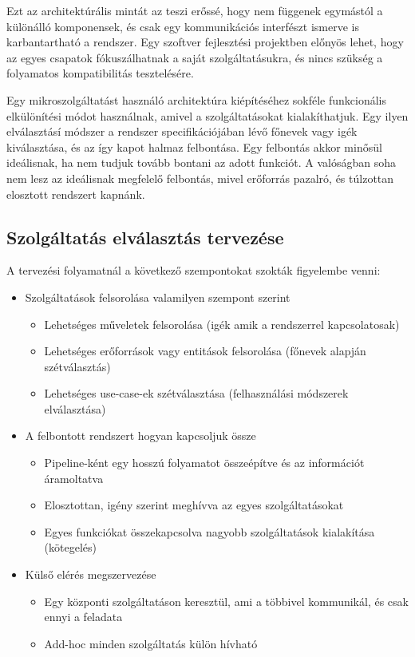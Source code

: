 \documentclass[11pt,magyar,a4paper,twoside,]{report}
\providecommand{\tightlist}{%
  \setlength{\itemsep}{0pt}\setlength{\parskip}{0pt}}
\begin{document}
Ezt az architektúrális mintát az teszi erőssé, hogy nem függenek
egymástól a különálló komponensek, és csak egy kommunikációs interfészt
ismerve is karbantartható a rendszer. Egy szoftver fejlesztési
projektben előnyös lehet, hogy az egyes csapatok fókuszálhatnak a saját
szolgáltatásukra, és nincs szükség a folyamatos kompatibilitás
tesztelésére.

Egy mikroszolgáltatást használó architektúra kiépítéséhez sokféle
funkcionális elkülönítési módot használnak, amivel a szolgáltatásokat
kialakíthatjuk. Egy ilyen elválasztásí módszer a rendszer
specifikációjában lévő főnevek vagy igék kiválasztása, és az így kapot
halmaz felbontása. Egy felbontás akkor minősül ideálisnak, ha nem tudjuk
tovább bontani az adott funkciót. A valóságban soha nem lesz az
ideálisnak megfelelő felbontás, mivel erőforrás pazalró, és túlzottan
elosztott rendszert kapnánk.

\subsection{\texorpdfstring{Szolgáltatás elválasztás
tervezése\label{splitting}}{Szolgáltatás elválasztás tervezése}}\label{szolguxe1ltatuxe1s-elvuxe1lasztuxe1s-tervezuxe9se}

A tervezési folyamatnál a következő szempontokat szokták figyelembe
venni:

\begin{itemize}
\tightlist
\item
  Szolgáltatások felsorolása valamilyen szempont szerint

  \begin{itemize}
  \tightlist
  \item
    Lehetséges műveletek felsorolása (igék amik a rendszerrel
    kapcsolatosak)
  \item
    Lehetséges erőforrások vagy entitások felsorolása (főnevek alapján
    szétválasztás)
  \item
    Lehetséges use-case-ek szétválasztása (felhasználási módszerek
    elválasztása)
  \end{itemize}
\item
  A felbontott rendszert hogyan kapcsoljuk össze

  \begin{itemize}
  \tightlist
  \item
    Pipeline-ként egy hosszú folyamatot összeépítve és az információt
    áramoltatva
  \item
    Elosztottan, igény szerint meghívva az egyes szolgáltatásokat
  \item
    Egyes funkciókat összekapcsolva nagyobb szolgáltatások kialakítása
    (kötegelés)
  \end{itemize}
\item
  Külső elérés megszervezése

  \begin{itemize}
  \tightlist
  \item
    Egy központi szolgáltatáson keresztül, ami a többivel kommunikál, és
    csak ennyi a feladata
  \item
    Add-hoc minden szolgáltatás külön hívható
  \end{itemize}
\end{itemize}
\end{document}
